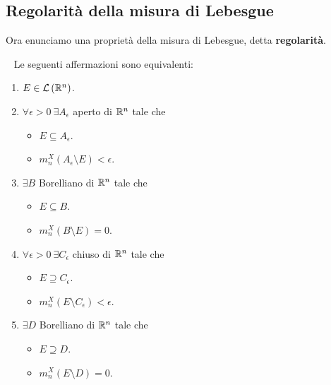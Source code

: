 \subsection{Regolarità della misura di Lebesgue}
Ora enunciamo una proprietà della misura di Lebesgue, detta \textbf{regolarità}.
\begin{theorema}~{}\label{regolaritàlebesgue}
	Le seguenti affermazioni sono equivalenti:
	\begin{enumerate}
		\item $E\in\mathcal{L}\left(\mathbb{R}^n\right)$.
		\item $\forall \epsilon > 0\ \exists A_{\epsilon}$ aperto di $\mathbb{R}^n$ tale che
		\begin{itemize}
			\item $E\subseteq A_{\epsilon}$.
			\item $m^{X}_n\left(A_{\epsilon}\setminus E\right)<\epsilon$.
		\end{itemize}
		\item $\exists B$ Borelliano di $\mathbb{R}^n$ tale che
	\begin{itemize}
		\item $E\subseteq B$.
		\item $m^{X}_n\left(B\setminus E\right)=0$.
	\end{itemize}
	\item $\forall \epsilon > 0\ \exists C_{\epsilon}$ chiuso di $\mathbb{R}^n$ tale che
	\begin{itemize}
		\item $E\supseteq C_{\epsilon}$.
		\item $m^{X}_n\left(E\setminus C_{\epsilon}\right)<\epsilon$.
	\end{itemize}
	\item $\exists D$ Borelliano di $\mathbb{R}^n$ tale che
	\begin{itemize}
		\item $E\supseteq D$.
		\item $m^{X}_n\left(E\setminus D\right)=0$.
	\end{itemize}
	\end{enumerate}
\end{theorema}
\begin{demonstration}
\end{demonstration}
